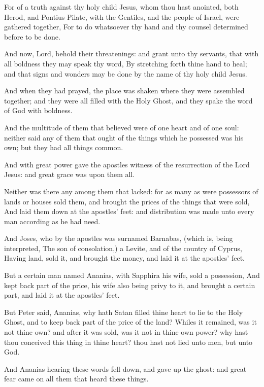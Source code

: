 \Verse For of a truth against thy holy child Jesus, whom thou hast anointed, both Herod, and Pontius Pilate, with the Gentiles, and the people of Israel, were gathered together, \Verse For to do whatsoever thy hand and thy counsel determined before to be done.

\Verse And now, Lord, behold their threatenings: and grant unto thy servants, that with all boldness they may speak thy word, \Verse By stretching forth thine hand to heal; and that signs and wonders may be done by the name of thy holy child Jesus.

\Verse And when they had prayed, the place was shaken where they were assembled together; and they were all filled with the Holy Ghost, and they spake the word of God with boldness.

\Verse And the multitude of them that believed were of one heart and of one soul: neither said any of them that ought of the things which he possessed was his own; but they had all things common.

\Verse And with great power gave the apostles witness of the resurrection of the Lord Jesus: and great grace was upon them all.

\Verse Neither was there any among them that lacked: for as many as were possessors of lands or houses sold them, and brought the prices of the things that were sold, \Verse And laid them down at the apostles' feet: and distribution was made unto every man according as he had need.

\Verse And Joses, who by the apostles was surnamed Barnabas, (which is, being interpreted, The son of consolation,) a Levite, and of the country of Cyprus, \Verse Having land, sold it, and brought the money, and laid it at the apostles' feet.


\Chapter
\Verse But a certain man named Ananias, with Sapphira his wife, sold a possession, \Verse And kept back part of the price, his wife also being privy to it, and brought a certain part, and laid it at the apostles' feet.

\Verse But Peter said, Ananias, why hath Satan filled thine heart to lie to the Holy Ghost, and to keep back part of the price of the land?  \Verse Whiles it remained, was it not thine own? and after it was sold, was it not in thine own power? why hast thou conceived this thing in thine heart?  thou hast not lied unto men, but unto God.

\Verse And Ananias hearing these words fell down, and gave up the ghost: and great fear came on all them that heard these things.

